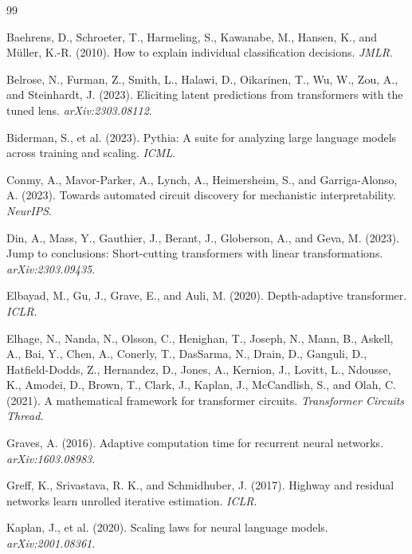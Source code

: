 \documentclass{article}
\begin{document}
\begin{thebibliography}{99}

Baehrens, D., Schroeter, T., Harmeling, S., Kawanabe, M., Hansen, K.,
and M{\"u}ller, K.-R. (2010).
How to explain individual classification decisions.
\textit{JMLR}.

Belrose, N., Furman, Z., Smith, L., Halawi, D., Oikarinen, T.,
Wu, W., Zou, A., and Steinhardt, J. (2023).
Eliciting latent predictions from transformers with the tuned lens.
\textit{arXiv:2303.08112}.

Biderman, S., et al. (2023).
Pythia: A suite for analyzing large language models across training and scaling.
\textit{ICML}.

Conmy, A., Mavor-Parker, A., Lynch, A., Heimersheim, S., and Garriga-Alonso, A. (2023).
Towards automated circuit discovery for mechanistic interpretability.
\textit{NeurIPS}.

Din, A., Mass, Y., Gauthier, J., Berant, J., Globerson, A., and Geva, M. (2023).
Jump to conclusions: Short-cutting transformers with linear transformations.
\textit{arXiv:2303.09435}.

Elbayad, M., Gu, J., Grave, E., and Auli, M. (2020).
Depth-adaptive transformer.
\textit{ICLR}.

Elhage, N., Nanda, N., Olsson, C., Henighan, T., Joseph, N., Mann, B.,
Askell, A., Bai, Y., Chen, A., Conerly, T., DasSarma, N., Drain, D.,
Ganguli, D., Hatfield-Dodds, Z., Hernandez, D., Jones, A.,
Kernion, J., Lovitt, L., Ndousse, K., Amodei, D., Brown, T., Clark, J.,
Kaplan, J., McCandlish, S., and Olah, C. (2021).
A mathematical framework for transformer circuits.
\textit{Transformer Circuits Thread}.

Graves, A. (2016).
Adaptive computation time for recurrent neural networks.
\textit{arXiv:1603.08983}.

Greff, K., Srivastava, R. K., and Schmidhuber, J. (2017).
Highway and residual networks learn unrolled iterative estimation.
\textit{ICLR}.

Kaplan, J., et al. (2020).
Scaling laws for neural language models.
\textit{arXiv:2001.08361}.


\end{thebibliography}
\end{document}
